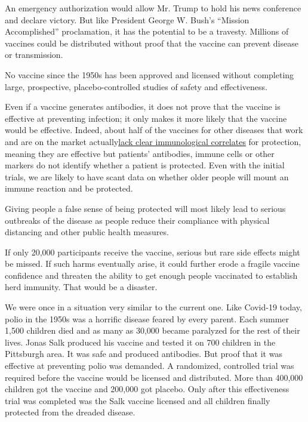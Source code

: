 An emergency authorization would allow Mr. Trump to hold his news
conference and declare victory. But like President George W. Bush's
``Mission Accomplished'' proclamation, it has the potential to be a
travesty. Millions of vaccines could be distributed without proof that
the vaccine can prevent disease or transmission.

No vaccine since the 1950s has been approved and licensed without
completing large, prospective, placebo-controlled studies of safety and
effectiveness.

Even if a vaccine generates antibodies, it does not prove that the
vaccine is effective at preventing infection; it only makes it more
likely that the vaccine would be effective. Indeed, about half of the
vaccines for other diseases that work and are on the market
actually\href{https://www.ncbi.nlm.nih.gov/pmc/articles/PMC2897268/\#:~:text=Although\%20the\%20immune\%20system\%20is,well\%20as\%20quantity\%2C\%20are\%20important.}{lack
clear immunological correlates} for protection, meaning they are
effective but patients' antibodies, immune cells or other markers do not
identify whether a patient is protected. Even with the initial trials,
we are likely to have scant data on whether older people will mount an
immune reaction and be protected.

Giving people a false sense of being protected will most likely lead to
serious outbreaks of the disease as people reduce their compliance with
physical distancing and other public health measures.

If only 20,000 participants receive the vaccine, serious but rare side
effects might be missed. If such harms eventually arise, it could
further erode a fragile vaccine confidence and threaten the ability to
get enough people vaccinated to establish herd immunity. That would be a
disaster.

We were once in a situation very similar to the current one. Like
Covid-19 today, polio in the 1950s was a horrific disease feared by
every parent. Each summer 1,500 children died and as many as 30,000
became paralyzed for the rest of their lives. Jonas Salk produced his
vaccine and tested it on 700 children in the Pittsburgh area. It was
safe and produced antibodies. But proof that it was effective at
preventing polio was demanded. A randomized, controlled trial was
required before the vaccine would be licensed and distributed. More than
400,000 children got the vaccine and 200,000 got placebo. Only after
this effectiveness trial was completed was the Salk vaccine licensed and
all children finally protected from the dreaded disease.

